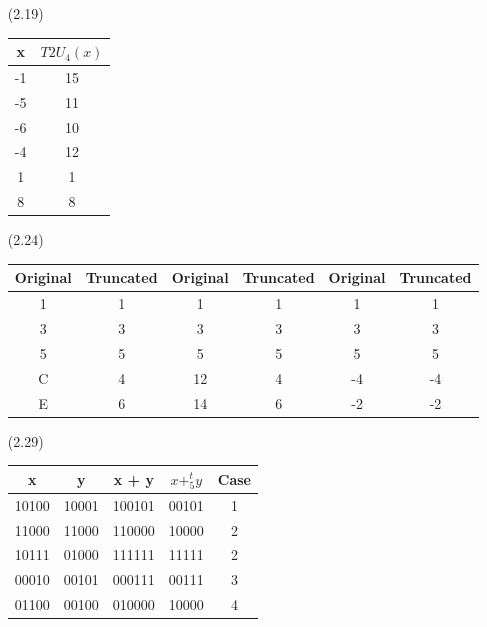 \documentclass[11pt]{article}
\begin{document}
\begin{enumerate}
        \item[(2.19)]
            \begin{tabular}{||c | c||} 
            \hline
            x & $T2U_4(x)$ \\ [0.5ex] 
            \hline\hline
            -1 & 15  \\ 
            \hline
            -5 & 11 \\
            \hline
            -6 & 10 \\
            \hline
            -4 & 12 \\
            \hline
            1 & 1 \\
            \hline
            8 & 8 \\ 
            \hline
            \end{tabular}
        \item[(2.24)]
            \begin{tabular}{||c | c || c | c || c | c||} 
            \hline
            Original & Truncated & Original & Truncated & Original & Truncated \\ [0.5ex] 
            \hline\hline
            1 & 1  & 1 & 1 & 1 & 1\\ 
            \hline
            3 & 3 & 3 & 3 & 3 & 3\\
            \hline
            5 & 5 & 5 & 5 & 5 & 5\\
            \hline
            C & 4 & 12 & 4 & -4 & -4\\
            \hline
            E & 6 & 14 & 6 & -2 & -2\\
            \hline
            \end{tabular}
        \item[(2.29)]
            \begin{tabular}{||c | c | c | c | c ||} 
            \hline
            x & y & x + y & $x +^t_5 y$ & Case \\ [0.5ex] 
            \hline\hline
            10100 & 10001  & 100101 & 00101 &  1\\ 
            \hline
            11000 & 11000 & 110000 & 10000 &  2\\
            \hline
            10111 & 01000 & 111111 & 11111 &  2\\
            \hline
            00010 & 00101 & 000111 & 00111 & 3\\
            \hline
            01100 & 00100 & 010000 & 10000 &  4\\
            \hline
            \end{tabular}

\end{enumerate}
\end{document}
